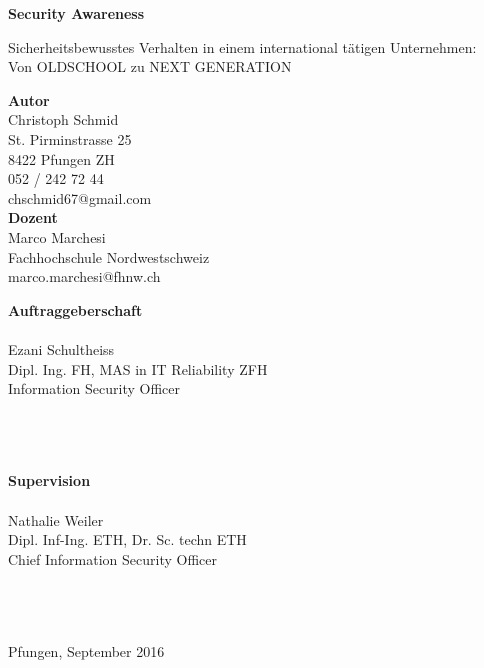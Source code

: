 \documentclass[../../main.tex]{subfiles}
\begin{document}
\vspace*{6cm}

\textbf{Security Awareness}

Sicherheitsbewusstes Verhalten in einem international tätigen Unternehmen: \\Von OLDSCHOOL zu NEXT GENERATION 
\vspace{1cm}

\textbf{Autor}\\
Christoph Schmid\\
St. Pirminstrasse 25\\
8422 Pfungen ZH\\
052 / 242 72 44\\
chschmid67@gmail.com\\


\textbf{Dozent}\\
Marco Marchesi\\
Fachhochschule Nordwestschweiz\\
marco.marchesi@fhnw.ch\\


\noindent
\begin{minipage}[H]{0.5\textwidth}
\textbf{Auftraggeberschaft}\\
\company\\
Ezani Schultheiss\\
Dipl. Ing. FH, MAS in IT Reliability ZFH\\
Information Security Officer\\
\companystreetmoz\\
\companycitymoz\\
\companyfonmoz\\
\companyemailmoz
\end{minipage}
\hfill
\begin{minipage}[H]{0.5\textwidth}
\textbf{Supervision}\\
\company\\
Nathalie Weiler\\
Dipl. Inf-Ing. ETH, Dr. Sc. techn ETH\\
Chief Information Security Officer\\
\companystreetnawe\\
\companycitynawe\\
\companyfonnawe\\
\companyemailnawe
\end{minipage}

\vspace{1cm}

Pfungen, September 2016
\end{document}

